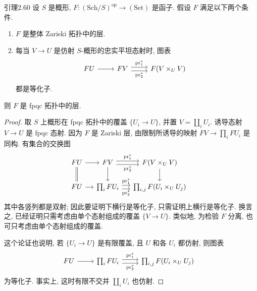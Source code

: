 \begin{origstatement}{引理}{2.60}\label{ch02:lem260}
设 $S$ 是概形, $F:(\mathrm{Sch}/S)^{\mathrm{op}}\to(\mathrm{Set})$ 是函子. 假设 $F$ 满足以下两个条件.
\begin{enumerate}
\item[(i)] $F$ 是整体 Zariski 拓扑中的层.
\item[(ii)] 每当 $V\to U$ 是仿射 $S$-概形的忠实平坦态射时, 图表
\[
\begin{tikzcd}
FU\arrow[r]&FV\arrow[r,shift left=.6ex,"\mathrm{pr}_1^*"]\arrow[r,shift right=.6ex,"\mathrm{pr}_2^*"']&F(V\times_UV)
\end{tikzcd}
\]
都是等化子.
\end{enumerate}
则 $F$ 是 fpqc 拓扑中的层.
\end{origstatement}
\begin{proof}
取 $S$ 上概形在 fpqc 拓扑中的覆盖 $\{U_i\to U\}$, 并置 $V=\coprod_iU_i$. 诱导态射 $V\to U$ 是 fpqc 态射. 因为 $F$ 是 Zariski 层, 由限制所诱导的映射 $FV\to\prod_iFU_i$ 是同构. 有集合的交换图
\[
\begin{tikzcd}[column sep=small]
FU\arrow[r]\arrow[d,equal]&FV\arrow[r,shift left=.6ex,"\mathrm{pr}_1^*"]\arrow[r,shift right=.6ex,"\mathrm{pr}_2^*"']\arrow[d]&F(V\times_UV)\arrow[d]\\
FU\arrow[r]&\prod_iFU_i\arrow[r,shift left=.6ex,"\mathrm{pr}_1^*"]\arrow[r,shift right=.6ex,"\mathrm{pr}_2^*"']&\prod_{i,j}F(U_i\times_UU_j)
\end{tikzcd}
\]
其中各竖列都是双射; 因此要证明下横行是等化子, 只需证明上横行是等化子. 换言之, 已经证明只需考虑由单个态射组成的覆盖 $\{V\to U\}$. 类似地, 为检验 $F$ 分离, 也可只考虑由单个态射组成的覆盖.

这个论证也说明, 若 $\{U_i\to U\}$ 是有限覆盖, 且 $U$ 和各 $U_i$ 都仿射, 则图表
\[
\begin{tikzcd}
FU\arrow[r]&\prod_iFU_i\arrow[r,shift left=.6ex,"\mathrm{pr}_1^*"]\arrow[r,shift right=.6ex,"\mathrm{pr}_2^*"']&\prod_{i,j}F(U_i\times_UU_j)
\end{tikzcd}
\]
为等化子. 事实上, 这时有限不交并 $\coprod_iU_i$ 也仿射.


\end{proof}
